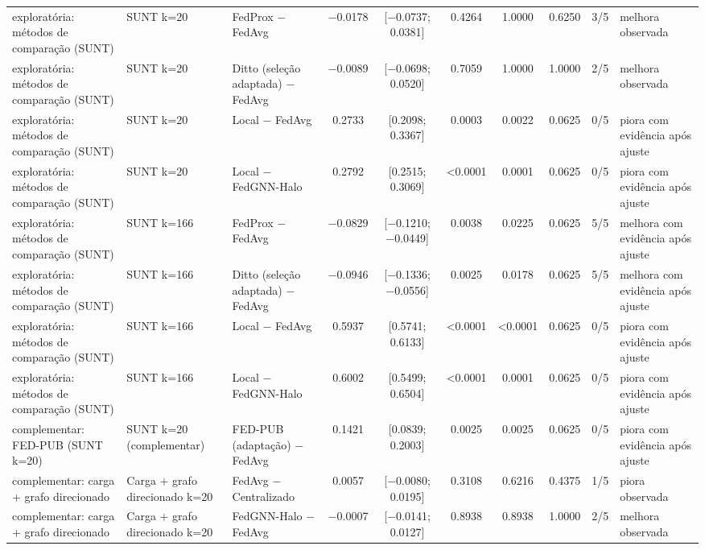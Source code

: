 \begin{tabular}{lllccccccl}
exploratória: métodos de comparação (SUNT) & SUNT k=20 & FedProx − FedAvg & \num{-0.0178} & [\num{-0.0737}; \num{+0.0381}] & \num{0.4264} & \num{1.0000} & \num{0.6250} & 3/5 & melhora observada \\
exploratória: métodos de comparação (SUNT) & SUNT k=20 & Ditto (seleção adaptada) − FedAvg & \num{-0.0089} & [\num{-0.0698}; \num{+0.0520}] & \num{0.7059} & \num{1.0000} & \num{1.0000} & 2/5 & melhora observada \\
exploratória: métodos de comparação (SUNT) & SUNT k=20 & Local − FedAvg & \num{+0.2733} & [\num{+0.2098}; \num{+0.3367}] & \num{0.0003} & \num{0.0022} & \num{0.0625} & 0/5 & piora com evidência após ajuste \\
exploratória: métodos de comparação (SUNT) & SUNT k=20 & Local − FedGNN-Halo & \num{+0.2792} & [\num{+0.2515}; \num{+0.3069}] & \num{<0.0001} & \num{0.0001} & \num{0.0625} & 0/5 & piora com evidência após ajuste \\
exploratória: métodos de comparação (SUNT) & SUNT k=166 & FedProx − FedAvg & \num{-0.0829} & [\num{-0.1210}; \num{-0.0449}] & \num{0.0038} & \num{0.0225} & \num{0.0625} & 5/5 & melhora com evidência após ajuste \\
exploratória: métodos de comparação (SUNT) & SUNT k=166 & Ditto (seleção adaptada) − FedAvg & \num{-0.0946} & [\num{-0.1336}; \num{-0.0556}] & \num{0.0025} & \num{0.0178} & \num{0.0625} & 5/5 & melhora com evidência após ajuste \\
exploratória: métodos de comparação (SUNT) & SUNT k=166 & Local − FedAvg & \num{+0.5937} & [\num{+0.5741}; \num{+0.6133}] & \num{<0.0001} & \num{<0.0001} & \num{0.0625} & 0/5 & piora com evidência após ajuste \\
exploratória: métodos de comparação (SUNT) & SUNT k=166 & Local − FedGNN-Halo & \num{+0.6002} & [\num{+0.5499}; \num{+0.6504}] & \num{<0.0001} & \num{0.0001} & \num{0.0625} & 0/5 & piora com evidência após ajuste \\
complementar: FED-PUB (SUNT k=20) & SUNT k=20 (complementar) & FED-PUB (adaptação) − FedAvg & \num{+0.1421} & [\num{+0.0839}; \num{+0.2003}] & \num{0.0025} & \num{0.0025} & \num{0.0625} & 0/5 & piora com evidência após ajuste \\
complementar: carga + grafo direcionado & Carga + grafo direcionado k=20 & FedAvg − Centralizado & \num{+0.0057} & [\num{-0.0080}; \num{+0.0195}] & \num{0.3108} & \num{0.6216} & \num{0.4375} & 1/5 & piora observada \\
complementar: carga + grafo direcionado & Carga + grafo direcionado k=20 & FedGNN-Halo − FedAvg & \num{-0.0007} & [\num{-0.0141}; \num{+0.0127}] & \num{0.8938} & \num{0.8938} & \num{1.0000} & 2/5 & melhora observada \\

\end{tabular}
